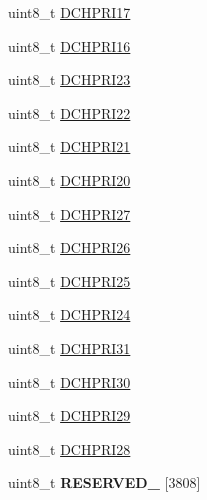\begin{DoxyCompactItemize}
\item 
uint8\+\_\+t \hyperlink{struct_d_m_a___mem_map_a4d83e1d73024969feb88d8f3fd56de2e}{D\+C\+H\+P\+R\+I17}
\item 
uint8\+\_\+t \hyperlink{struct_d_m_a___mem_map_af60c241fd440397566335b20911e600e}{D\+C\+H\+P\+R\+I16}
\item 
uint8\+\_\+t \hyperlink{struct_d_m_a___mem_map_af63f0406db2347f2e2df55ce783726b5}{D\+C\+H\+P\+R\+I23}
\item 
uint8\+\_\+t \hyperlink{struct_d_m_a___mem_map_a4a5d6f9d53dc792e4cd280791bdda559}{D\+C\+H\+P\+R\+I22}
\item 
uint8\+\_\+t \hyperlink{struct_d_m_a___mem_map_a0d6eeca1fee4d374b6e129415925227f}{D\+C\+H\+P\+R\+I21}
\item 
uint8\+\_\+t \hyperlink{struct_d_m_a___mem_map_af65c1f3dfc3eb294a30201a49c496aa4}{D\+C\+H\+P\+R\+I20}
\item 
uint8\+\_\+t \hyperlink{struct_d_m_a___mem_map_a54750bb00df4679829c608f6ee23dadc}{D\+C\+H\+P\+R\+I27}
\item 
uint8\+\_\+t \hyperlink{struct_d_m_a___mem_map_af17011bb74643176e41ef82482747d0e}{D\+C\+H\+P\+R\+I26}
\item 
uint8\+\_\+t \hyperlink{struct_d_m_a___mem_map_ad3fdbf296bf5056b5b5cbc525aa2941c}{D\+C\+H\+P\+R\+I25}
\item 
uint8\+\_\+t \hyperlink{struct_d_m_a___mem_map_aa7a44ca4d68644b23788b2e8f857245b}{D\+C\+H\+P\+R\+I24}
\item 
uint8\+\_\+t \hyperlink{struct_d_m_a___mem_map_a56a0eb82e4a9a4efbf99c59b6bb61e36}{D\+C\+H\+P\+R\+I31}
\item 
uint8\+\_\+t \hyperlink{struct_d_m_a___mem_map_afe8b6945db421c7419c55322aa278565}{D\+C\+H\+P\+R\+I30}
\item 
uint8\+\_\+t \hyperlink{struct_d_m_a___mem_map_a5a09a06fd8ca598627150607ae8c3679}{D\+C\+H\+P\+R\+I29}
\item 
uint8\+\_\+t \hyperlink{struct_d_m_a___mem_map_ae38469ea2957f2187c96c385ff66fa68}{D\+C\+H\+P\+R\+I28}
\item 
\hypertarget{struct_d_m_a___mem_map_af35ba3e27cd74f2e31a31a3eac2cbcf8}{}uint8\+\_\+t {\bfseries R\+E\+S\+E\+R\+V\+E\+D\+\_} \mbox{[}3808\mbox{]}\label{struct_d_m_a___mem_map_af35ba3e27cd74f2e31a31a3eac2cbcf8}


\end{DoxyCompactItemize}
